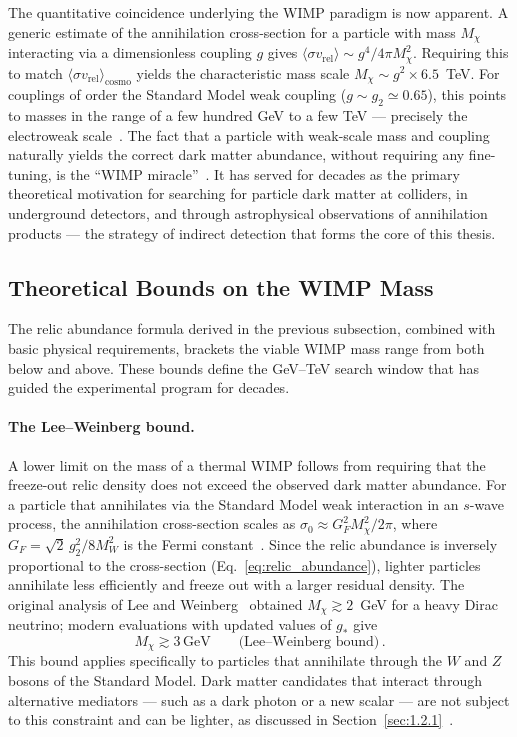 The quantitative coincidence underlying the WIMP paradigm is now apparent.
A generic estimate of the annihilation cross-section for a particle with mass $M_\chi$ interacting via a dimensionless coupling $g$ gives $\langle \sigma v_\mathrm{rel} \rangle \sim g^4 / 4\pi M_\chi^2$.
Requiring this to match $\langle \sigma v_\mathrm{rel} \rangle_\mathrm{cosmo}$ yields the characteristic mass scale $M_\chi \sim g^2 \times 6.5$~TeV.
For couplings of order the Standard Model weak coupling ($g \sim g_2 \simeq 0.65$), this points to masses in the range of a few hundred GeV to a few TeV --- precisely the electroweak scale~\cite{Cirelli:2024ssz}.
The fact that a particle with weak-scale mass and coupling naturally yields the correct dark matter abundance, without requiring any fine-tuning, is the ``WIMP miracle''~\cite{Cirelli:2024ssz}.
It has served for decades as the primary theoretical motivation for searching for particle dark matter at colliders, in underground detectors, and through astrophysical observations of annihilation products --- the strategy of indirect detection that forms the core of this thesis.

\subsection{Theoretical Bounds on the WIMP Mass}
\label{sec:1.2.3}

The relic abundance formula derived in the previous subsection, combined with basic physical requirements, brackets the viable WIMP mass range from both below and above.
These bounds define the GeV--TeV search window that has guided the experimental program for decades.

\paragraph{The Lee--Weinberg bound.}
A lower limit on the mass of a thermal WIMP follows from requiring that the freeze-out relic density does not exceed the observed dark matter abundance.
For a particle that annihilates via the Standard Model weak interaction in an $s$-wave process, the annihilation cross-section scales as $\sigma_0 \approx G_F^2 M_\chi^2 / 2\pi$, where $G_F = \sqrt{2}\,g_2^2 / 8M_W^2$ is the Fermi constant~\cite{Cirelli:2024ssz}.
Since the relic abundance is inversely proportional to the cross-section (Eq.~\eqref{eq:relic_abundance}), lighter particles annihilate less efficiently and freeze out with a larger residual density.
The original analysis of Lee and Weinberg~\cite{Lee:1977ua} obtained $M_\chi \gtrsim 2$~GeV for a heavy Dirac neutrino; modern evaluations with updated values of $g_*$ give~\cite{Cirelli:2024ssz}
\begin{equation}
	M_\chi \gtrsim 3 \, \mathrm{GeV} \qquad \text{(Lee--Weinberg bound)} \,.
	\label{eq:lee_weinberg}
\end{equation}
This bound applies specifically to particles that annihilate through the $W$ and $Z$ bosons of the Standard Model.
Dark matter candidates that interact through alternative mediators --- such as a dark photon or a new scalar --- are not subject to this constraint and can be lighter, as discussed in Section~\ref{sec:1.2.1}~\cite{Cirelli:2024ssz}.

